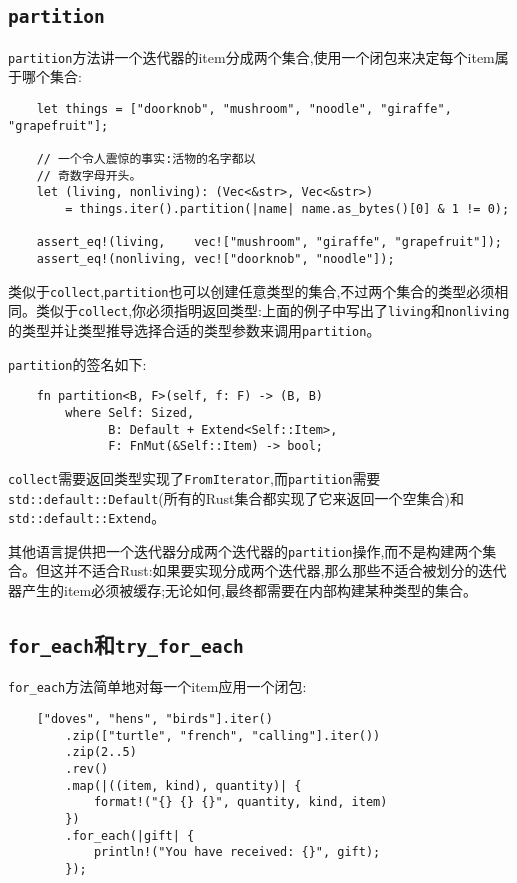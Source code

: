 \subsection{\texttt{partition}}
\texttt{partition}方法讲一个迭代器的item分成两个集合,使用一个闭包来决定每个item属于哪个集合:
\begin{verbatim}
    let things = ["doorknob", "mushroom", "noodle", "giraffe", "grapefruit"];

    // 一个令人震惊的事实:活物的名字都以
    // 奇数字母开头。
    let (living, nonliving): (Vec<&str>, Vec<&str>)
        = things.iter().partition(|name| name.as_bytes()[0] & 1 != 0);
    
    assert_eq!(living,    vec!["mushroom", "giraffe", "grapefruit"]);
    assert_eq!(nonliving, vec!["doorknob", "noodle"]);
\end{verbatim}

类似于\texttt{collect},\texttt{partition}也可以创建任意类型的集合,不过两个集合的类型必须相同。类似于\texttt{collect},你必须指明返回类型:上面的例子中写出了\texttt{living}和\texttt{nonliving}的类型并让类型推导选择合适的类型参数来调用\texttt{partition}。

\texttt{partition}的签名如下:
\begin{verbatim}
    fn partition<B, F>(self, f: F) -> (B, B)
        where Self: Sized,
              B: Default + Extend<Self::Item>,
              F: FnMut(&Self::Item) -> bool;
\end{verbatim}
\texttt{collect}需要返回类型实现了\texttt{FromIterator},而\texttt{partition}需要\texttt{std::default::Default}(所有的Rust集合都实现了它来返回一个空集合)和\texttt{std::default::Extend}。

其他语言提供把一个迭代器分成两个迭代器的\texttt{partition}操作,而不是构建两个集合。但这并不适合Rust:如果要实现分成两个迭代器,那么那些不适合被划分的迭代器产生的item必须被缓存;无论如何,最终都需要在内部构建某种类型的集合。

\subsection{\texttt{for\_each}和\texttt{try\_for\_each}}
\texttt{for\_each}方法简单地对每一个item应用一个闭包:
\begin{verbatim}
    ["doves", "hens", "birds"].iter()
        .zip(["turtle", "french", "calling"].iter())
        .zip(2..5)
        .rev()
        .map(|((item, kind), quantity)| {
            format!("{} {} {}", quantity, kind, item)
        })
        .for_each(|gift| {
            println!("You have received: {}", gift);
        });
\end{verbatim}

